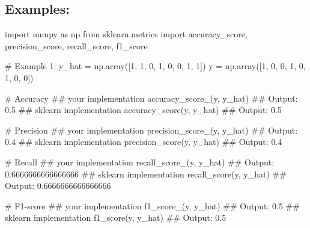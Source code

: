 \documentclass[]{article}
\newenvironment{Shaded}{\begin{snugshade}}{\end{snugshade}}
\newcommand{\CommentTok}[1]{\textcolor[rgb]{0.48,0.49,0.49}{#1}}
\newcommand{\DecValTok}[1]{\textcolor[rgb]{0.96,0.45,0.00}{#1}}
\newcommand{\FloatTok}[1]{\textcolor[rgb]{0.96,0.45,0.00}{#1}}
\newcommand{\ImportTok}[1]{\textcolor[rgb]{0.15,0.68,0.38}{#1}}
\newcommand{\NormalTok}[1]{\textcolor[rgb]{0.81,0.81,0.76}{#1}}
\newcommand{\OperatorTok}[1]{\textcolor[rgb]{0.81,0.81,0.76}{#1}}
\begin{document}
\hypertarget{examples-9}{%
\subsection{Examples:}\label{examples-9}}

\begin{Shaded}
\begin{Highlighting}[]
\ImportTok{import}\NormalTok{ numpy }\ImportTok{as}\NormalTok{ np}
\ImportTok{from}\NormalTok{ sklearn.metrics }\ImportTok{import}\NormalTok{ accuracy_score, precision_score, recall_score, f1_score   }

\CommentTok{# Example 1:}
\NormalTok{y_hat }\OperatorTok{=}\NormalTok{ np.array([}\DecValTok{1}\NormalTok{, }\DecValTok{1}\NormalTok{, }\DecValTok{0}\NormalTok{, }\DecValTok{1}\NormalTok{, }\DecValTok{0}\NormalTok{, }\DecValTok{0}\NormalTok{, }\DecValTok{1}\NormalTok{, }\DecValTok{1}\NormalTok{])}
\NormalTok{y }\OperatorTok{=}\NormalTok{ np.array([}\DecValTok{1}\NormalTok{, }\DecValTok{0}\NormalTok{, }\DecValTok{0}\NormalTok{, }\DecValTok{1}\NormalTok{, }\DecValTok{0}\NormalTok{, }\DecValTok{1}\NormalTok{, }\DecValTok{0}\NormalTok{, }\DecValTok{0}\NormalTok{])}

\CommentTok{# Accuracy}
\CommentTok{## your implementation}
\NormalTok{accuracy_score_(y, y_hat)}
\CommentTok{## Output:}
\FloatTok{0.5}
\CommentTok{## sklearn implementation}
\NormalTok{accuracy_score(y, y_hat)}
\CommentTok{## Output:}
\FloatTok{0.5}

\CommentTok{# Precision}
\CommentTok{## your implementation}
\NormalTok{precision_score_(y, y_hat)}
\CommentTok{## Output:}
\FloatTok{0.4}
\CommentTok{## sklearn implementation}
\NormalTok{precision_score(y, y_hat)}
\CommentTok{## Output:}
\FloatTok{0.4}

\CommentTok{# Recall}
\CommentTok{## your implementation}
\NormalTok{recall_score_(y, y_hat)}
\CommentTok{## Output:}
\FloatTok{0.6666666666666666}
\CommentTok{## sklearn implementation}
\NormalTok{recall_score(y, y_hat)}
\CommentTok{## Output:}
\FloatTok{0.6666666666666666}

\CommentTok{# F1-score}
\CommentTok{## your implementation}
\NormalTok{f1_score_(y, y_hat)}
\CommentTok{## Output:}
\FloatTok{0.5}
\CommentTok{## sklearn implementation}
\NormalTok{f1_score(y, y_hat)}
\CommentTok{## Output:}
\FloatTok{0.5}
\end{Highlighting}
\end{Shaded}
\end{document}
